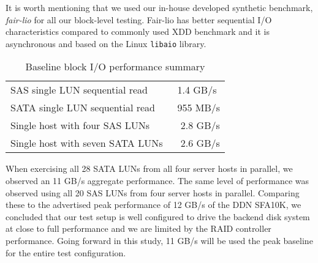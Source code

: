 

It is worth mentioning that we used our in-house developed synthetic benchmark,
\textit{fair-lio} for all our block-level testing.  Fair-lio has better
sequential I/O characteristics compared to commonly used XDD benchmark and it
is asynchronous and based on the Linux \verb!libaio! library.


\begin{table}[htb]
\centering
\caption{Baseline block I/O performance summary}
\label{tbl:block-io-baseline}

\begin{tabular}{ l | l }
    \hline
    SAS single LUN sequential read & ~1.4 GB/s \\
    SATA single LUN sequential read & ~955 MB/s \\
    Single host with four SAS LUNs & ~ 2.8 GB/s \\
    Single host with seven SATA LUNs & ~ 2.6 GB/s \\
    \hline
\end{tabular}
\end{table}

When exercising all 28 SATA LUNs from all four server hosts in parallel, we
observed an 11 GB/s aggregate performance. The same level of performance was
observed using all 20 SAS LUNs from four server hosts in parallel. Comparing
these to the advertised peak performance of 12 GB/s of the DDN SFA10K, we
concluded that our test setup is well configured to drive the backend disk
system at close to full performance and we are limited by the RAID controller
performance. Going forward in this study, 11 GB/s will be used the peak
baseline for the entire test configuration.


